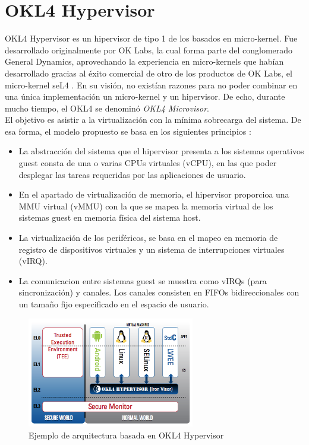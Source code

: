 \section{OKL4 Hypervisor}
OKL4 Hypervisor es un hipervisor de tipo 1 de los basados en micro-kernel. Fue desarrollado originalmente por OK Labs, la cual forma parte del conglomerado General Dynamics, aprovechando la experiencia en micro-kernels que habían desarrollado gracias al éxito comercial de otro de los productos de OK Labs, el micro-kernel seL4 \cite{seL4}. En su visión, no existían razones para no poder combinar en una única implementación un micro-kernel y un hipervisor. De echo, durante mucho tiempo, el OKL4 se denominó \textit{OKL4 Microvisor}.\\
El objetivo es asistir a la virtualización con la mínima sobrecarga del sistema. De esa forma, el modelo propuesto se basa en los siguientes principios \cite{okl4}:
\begin{itemize}
  \item La abstracción del sistema que el hipervisor presenta a los sistemas operativos guest consta de una o varias CPUs virtuales (\acrshort{vCPU}), en las que poder desplegar las tareas requeridas por las aplicaciones de usuario.
  \item En el apartado de virtualización de memoria, el hipervisor proporcioa una MMU virtual (\acrshort{vMMU}) con la que se mapea la memoria virtual de los sistemas guest en memoria física del sistema host.
  \item La virtualización de los periféricos, se basa en el mapeo en memoria de registro de dispositivos virtuales y un sistema de interrupciones virtuales (\acrshort{vIRQ}).
  \item La comunicacion entre sistemas guest se muestra como \acrshort{vIRQ}s (para sincronización) y canales. Los canales consisten en FIFOs bidireccionales con un tamaño fijo especificado en el espacio de usuario.
\end{itemize}
\begin{figure}[!htb]
	\centering
	\includegraphics[width=0.65\textwidth]{recursos/OK_L4_Microvisor.png}
	\caption{Ejemplo de arquitectura basada en OKL4 Hypervisor}
	\label{fig:OK_L4_Microvisor}
\end{figure}
